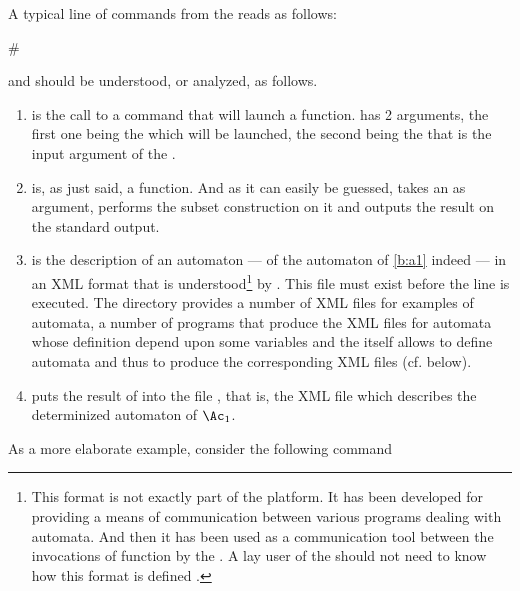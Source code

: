 A typical line of commands from the \tafkit reads as follows:
\begin{shell}
# 
\end{shell}
and should be understood, or analyzed, as follows.
\begin{enumerate}
\item {} is the call to a  command
  that will launch a \Vauc function.   has 2
  arguments, the first one being the  which will be
  launched, the second being the  that is the input
  argument of the .

\item {} is, as just said, a \Vauc function.  And as
  it can easily be guessed,  takes an
   as argument, performs the subset construction on it
  and outputs the result on the standard output.

\item {} is the description of an automaton --- of the
  automaton of \autoref{b:a1} indeed --- in an XML format that is
  understood\footnote{%
    This format is not exactly part of the \Vauc platform.  It has
    been developed for providing a means of communication between
    various programs dealing with automata.  And then it has been used
    as a communication tool between the invocations of \Vauc function
    by the \tafkit.  A lay user of the \tafkit should not need to know
    how this format is
    defined%
    .}  by \Vauc.
  This file must exist before the line is executed.  The
   directory provides a number of XML files for
  examples of automata, a number of programs that produce the XML
  files for automata whose definition depend upon some variables and
  the \tafkit itself allows to define automata and thus to produce the
  corresponding XML files (cf. below).

\item {} puts the result of  into
  the file , that is, the XML file which describes the
  determinized automaton of $\Ac_{1}$.
\end{enumerate}

\bigskip

As a more elaborate example, consider the following command

